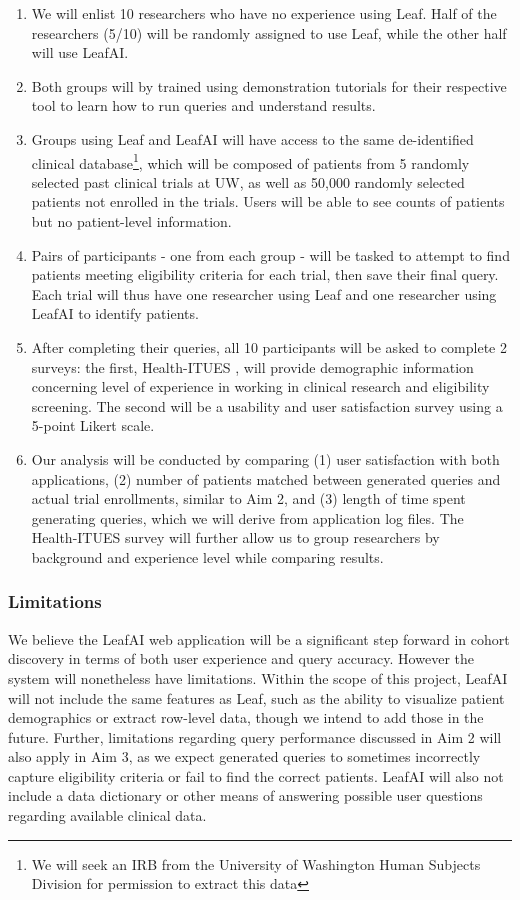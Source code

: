 \documentclass[../main.tex]{subfiles}
\begin{document}
\begin{enumerate}
    \item We will enlist 10 researchers who have no experience using Leaf. Half of the researchers (5/10) will be randomly assigned to use Leaf, while the other half will use LeafAI.
    \item Both groups will by trained using demonstration tutorials for their respective tool to learn how to run queries and understand results.
    \item Groups using Leaf and LeafAI will have access to the same de-identified clinical database\footnote{We will seek an IRB from the University of Washington Human Subjects Division for permission to extract this data}, which will be composed of patients from 5 randomly selected past clinical trials at UW, as well as 50,000 randomly selected patients not enrolled in the trials. Users will be able to see counts of patients but no patient-level information.
    \item Pairs of participants - one from each group - will be tasked to attempt to find patients meeting eligibility criteria for each trial, then save their final query. Each trial will thus have one researcher using Leaf and one researcher using LeafAI to identify patients.
    \item After completing their queries, all 10 participants will be asked to complete 2 surveys: the first, Health-ITUES \cite{yen2010development}, will provide demographic information concerning level of experience in working in clinical research and eligibility screening. The second will be a usability and user satisfaction survey using a 5-point Likert scale.
    \item Our analysis will be conducted by comparing (1) user satisfaction with both applications, (2) number of patients matched between generated queries and actual trial enrollments, similar to Aim 2, and (3) length of time spent generating queries, which we will derive from application log files. The Health-ITUES survey will further allow us to group researchers by background and experience level while comparing results.
\end{enumerate}

\subsubsection{Limitations}

We believe the LeafAI web application will be a significant step forward in cohort discovery in terms of both user experience and query accuracy. However the system will nonetheless have limitations. Within the scope of this project, LeafAI will not include the same features as Leaf, such as the ability to visualize patient demographics or extract row-level data, though we intend to add those in the future. Further, limitations regarding query performance discussed in Aim 2 will also apply in Aim 3, as we expect generated queries to sometimes incorrectly capture eligibility criteria or fail to find the correct patients. LeafAI will also not include a data dictionary or other means of answering possible user questions regarding available clinical data.
\end{document}
